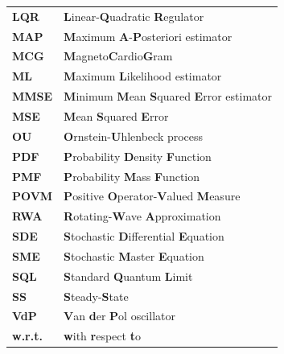 \documentclass[11pt]{article}
\begin{document}
\begin{table}[htbp]
{\begin{tabular}{ll}
  \textbf{LQR} & \textbf{L}inear-\textbf{Q}uadratic \textbf{R}egulator \\
  \textbf{MAP} & \textbf{M}aximum \textbf{A}-\textbf{P}osteriori estimator \\
  \textbf{MCG} & \textbf{M}agneto\textbf{C}ardio\textbf{G}ram \\
  \textbf{ML} & \textbf{M}aximum \textbf{L}ikelihood estimator \\
  \textbf{MMSE} & \textbf{M}inimum \textbf{M}ean \textbf{S}quared \textbf{E}rror estimator \\
  \textbf{MSE} & \textbf{M}ean \textbf{S}quared \textbf{E}rror \\
  \textbf{OU} & \textbf{O}rnstein-\textbf{U}hlenbeck process \\
  \textbf{PDF} & \textbf{P}robability \textbf{D}ensity \textbf{F}unction \\
  \textbf{PMF} & \textbf{P}robability \textbf{M}ass \textbf{F}unction \\
  \textbf{POVM} & \textbf{P}ositive \textbf{O}perator-\textbf{V}alued \textbf{M}easure \\
  \textbf{RWA} & \textbf{R}otating-\textbf{W}ave \textbf{A}pproximation \\
  \textbf{SDE} & \textbf{S}tochastic \textbf{D}ifferential \textbf{E}quation \\
  \textbf{SME} & \textbf{S}tochastic \textbf{M}aster \textbf{E}quation \\
  \textbf{SQL} & \textbf{S}tandard \textbf{Q}uantum \textbf{L}imit \\
  \textbf{SS} & \textbf{S}teady-\textbf{S}tate \\
  \textbf{VdP} & \textbf{V}an \textbf{d}er \textbf{P}ol oscillator \\
    \textbf{w.r.t.} & \textbf{w}ith \textbf{r}espect \textbf{t}o
\end{tabular}
}
\end{table}
\end{document}
